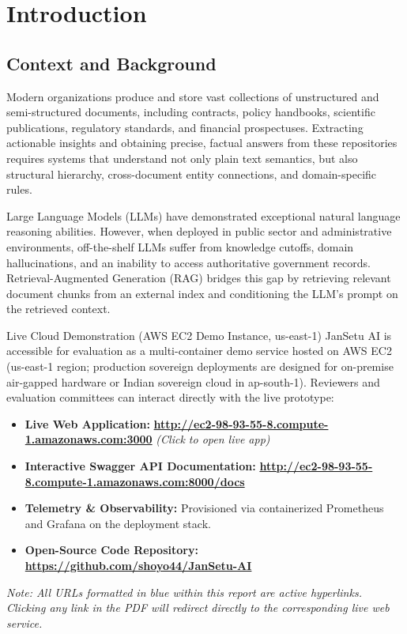 \documentclass[12pt,a4paper,oneside]{report}
\begin{document}
\chapter{Introduction}

\section{Context and Background}
Modern organizations produce and store vast collections of unstructured and semi-structured documents, including contracts, policy handbooks, scientific publications, regulatory standards, and financial prospectuses. Extracting actionable insights and obtaining precise, factual answers from these repositories requires systems that understand not only plain text semantics, but also structural hierarchy, cross-document entity connections, and domain-specific rules.

Large Language Models (LLMs) have demonstrated exceptional natural language reasoning abilities. However, when deployed in public sector and administrative environments, off-the-shelf LLMs suffer from knowledge cutoffs, domain hallucinations, and an inability to access authoritative government records. Retrieval-Augmented Generation (RAG) bridges this gap by retrieving relevant document chunks from an external index and conditioning the LLM's prompt on the retrieved context.

\begin{infobox}{Live Cloud Demonstration (AWS EC2 Demo Instance, us-east-1)}
JanSetu AI is accessible for evaluation as a multi-container demo service hosted on AWS EC2 (us-east-1 region; production sovereign deployments are designed for on-premise air-gapped hardware or Indian sovereign cloud in ap-south-1). Reviewers and evaluation committees can interact directly with the live prototype:
\begin{itemize}[leftmargin=*,itemsep=2pt,topsep=2pt]
    \item \textbf{Live Web Application:} \href{http://ec2-98-93-55-8.compute-1.amazonaws.com:3000}{\textbf{\color{linkblue}http://ec2-98-93-55-8.compute-1.amazonaws.com:3000}} \textit{(Click to open live app)}
    \item \textbf{Interactive Swagger API Documentation:} \href{http://ec2-98-93-55-8.compute-1.amazonaws.com:8000/docs}{\textbf{\color{linkblue}http://ec2-98-93-55-8.compute-1.amazonaws.com:8000/docs}}
    \item \textbf{Telemetry \& Observability:} Provisioned via containerized Prometheus and Grafana on the deployment stack.
    \item \textbf{Open-Source Code Repository:} \href{https://github.com/shoyo44/JanSetu-AI}{\textbf{\color{linkblue}https://github.com/shoyo44/JanSetu-AI}}
\end{itemize}
\textit{Note: All URLs formatted in blue within this report are active hyperlinks. Clicking any link in the PDF will redirect directly to the corresponding live web service.}
\end{infobox}
\end{document}
